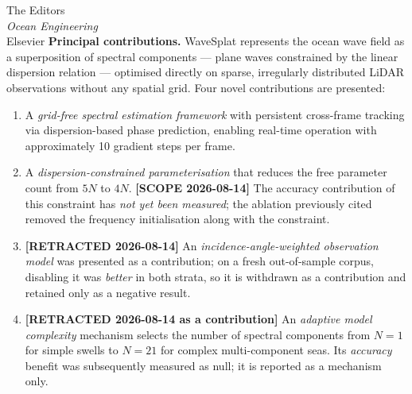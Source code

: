 \documentclass[11pt, a4paper]{letter}
\begin{document}
\begin{letter}{%
The Editors\\
\textit{Ocean Engineering}\\
Elsevier
}
\textbf{Principal contributions.}
WaveSplat represents the ocean wave field as a superposition of
spectral components — plane waves constrained by the linear dispersion
relation — optimised directly on sparse, irregularly distributed LiDAR
observations without any spatial grid.
Four novel contributions are presented:
\begin{enumerate}
  \item A \emph{grid-free spectral estimation framework} with persistent
    cross-frame tracking via dispersion-based phase prediction, enabling
    real-time operation with approximately 10 gradient steps per frame.
  \item A \emph{dispersion-constrained parameterisation} that reduces the
    free parameter count from $5N$ to $4N$.
    \textbf{[SCOPE 2026-08-14]} The accuracy contribution of this constraint
    has \emph{not yet been measured}; the ablation previously cited removed
    the frequency initialisation along with the constraint.
  \item \textbf{[RETRACTED 2026-08-14]} An \emph{incidence-angle-weighted
    observation model} was presented as a contribution; on a fresh
    out-of-sample corpus, disabling it was \emph{better} in both strata,
    so it is withdrawn as a contribution and retained only as a negative result.
  \item \textbf{[RETRACTED 2026-08-14 as a contribution]} An \emph{adaptive
    model complexity} mechanism selects the number of spectral components from
    $N{=}1$ for simple swells to $N{=}21$ for complex multi-component seas.
    Its \emph{accuracy} benefit was subsequently measured as null; it is
    reported as a mechanism only.
\end{enumerate}


\end{letter}
\end{document}
